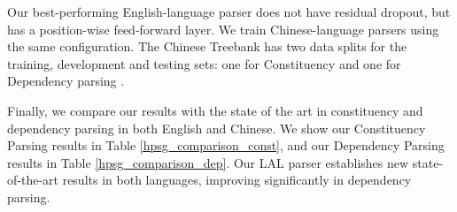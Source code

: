 \documentclass[11pt,a4paper]{article}
\begin{document}
Our best-performing English-language parser does not have residual dropout, but has a position-wise feed-forward layer. We train Chinese-language parsers using the same configuration. The Chinese Treebank has two data splits for the training, development and testing sets: one for Constituency \cite{liu-zhang-2017-shift} and one for Dependency parsing \cite{zhang-clark-2008-tale}. 

Finally, we compare our results with the state of the art in constituency and dependency parsing in both English and Chinese. We show our Constituency Parsing results in Table \ref{hpsg_comparison_const}, and our Dependency Parsing results in Table \ref{hpsg_comparison_dep}. Our LAL parser establishes new state-of-the-art results in both languages, improving significantly in dependency parsing.

\begin{table}[]
    \centering
    \caption{Dependency Parsing on PTB \& CTB test sets.}
    \label{hpsg_comparison_dep}
\end{table}
\end{document}
